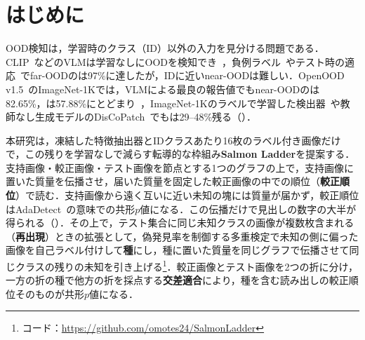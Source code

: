 
\section{はじめに}
OOD検知は，学習時のクラス（ID）以外の入力を見分ける問題である．CLIP~\cite{radford2021clip}などのVLMは学習なしにOODを検知でき~\cite{ming2022mcm}，負例ラベル~\cite{jiang2024neglabel}やテスト時の適応~\cite{zhang2024adaneg,zhang2026tanl,xu2026interneg,yang2026tins}でfar-OODの\AUC{}は97\%に達したが，IDに近いnear-OODは難しい．OpenOOD v1.5~\cite{zhang2023openood}のImageNet-1Kでは，VLMによる最良の報告値でもnear-OODの\AUC{}は82.65\%，\FPR{}は57.88\%にとどまり~\cite{yang2026tins}，ImageNet-1Kのラベルで学習した検出器~\cite{park2023nnguide,li2024moodv2}や教師なし生成モデルのDisCoPatch~\cite{caetano2025discopatch}でも\FPR{}は29--48\%残る（）．

本研究は，凍結した特徴抽出器とIDクラスあたり16枚のラベル付き画像だけで，この残りを学習なしで減らす転導的な枠組み\textbf{Salmon Ladder}を提案する．支持画像・較正画像・テスト画像を節点とする1つのグラフの上で，支持画像に置いた質量を伝播させ，届いた質量を固定した較正画像の中での順位（\textbf{較正順位}）で読む．支持画像から遠く互いに近い未知の塊には質量が届かず，較正順位はAdaDetect~\cite{marandon2024adadetect}の意味での共形$p$値になる．この伝播だけで見出しの数字の大半が得られる（）．その上で，テスト集合に同じ未知クラスの画像が複数枚含まれる（\textbf{再出現}）ときの拡張として，偽発見率を制御する多重検定で未知の側に偏った画像を自己ラベル付けして\textbf{種}にし，種に置いた質量を同じグラフで伝播させて同じクラスの残りの未知を引き上げる\footnote{コード：\url{https://github.com/omotes24/SalmonLadder}}．較正画像とテスト画像を2つの折に分け，一方の折の種で他方の折を採点する\textbf{交差適合}により，種を含む読み出しの較正順位そのものが共形$p$値になる．

